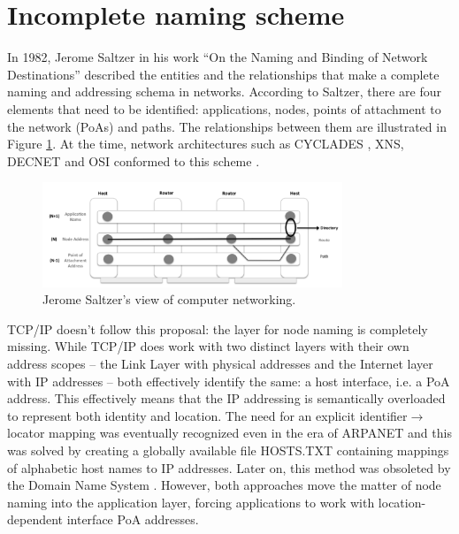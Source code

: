     \section{Incomplete naming scheme}\label{problems:naming}

        In 1982, Jerome Saltzer in his work ``On the Naming and Binding of Network Destinations'' \cite{rfc1498} described the entities and the relationships that make a complete naming and addressing schema in networks. According to Saltzer, there are four elements that need to be identified: applications, nodes, points of attachment to the network (PoAs) and paths. The relationships between them are illustrated in Figure \ref{fig:saltzer}. At the time, network architectures such as CYCLADES \cite{Cyclades}, XNS, DECNET and OSI conformed to this scheme \cite{internet_demo}.

        \begin{figure}[H]
            \begin{center}
                \includegraphics[width=0.8\textwidth]{fig/problems_saltzer.png}
              \caption{Jerome Saltzer's view of computer networking.}
              \label{fig:saltzer}
            \end{center}
        \end{figure}

        TCP/IP doesn't follow this proposal: the layer for node naming is completely missing. While TCP/IP does work with two distinct layers with their own address scopes -- the Link Layer with physical addresses and the Internet layer with IP addresses -- both effectively identify the same: a host interface, i.e. a PoA address. This effectively means that the IP addressing is semantically overloaded to represent both identity and location. The need for an explicit identifier$\rightarrow$locator mapping was eventually recognized even in the era of ARPANET and this was solved by creating a globally available file HOSTS.TXT containing mappings of alphabetic host names to IP addresses. Later on, this method was obsoleted by the Domain Name System \cite{rfc1034}. However, both approaches move the matter of node naming into the application layer, forcing applications to work with location-dependent interface PoA addresses.

